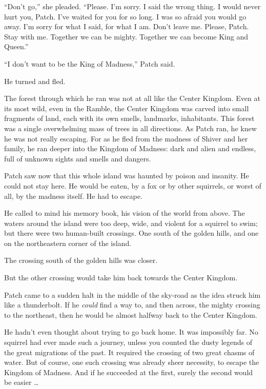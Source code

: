 \documentclass[ebook,oneside,openany,17pt]{memoir}
\newenvironment{tolerant}[1]{%
  \par\tolerance=#1\relax
}{%
  \par
}
\begin{document}
\begin{tolerant}{1000}
“Don’t go,” she pleaded. “Please. I’m sorry. I said the wrong thing. I
would never hurt you, Patch. I’ve waited for you for so long. I was so
afraid you would go away. I’m sorry for what I said, for what I
am. Don’t leave me. Please, Patch. Stay with me. Together we can be
mighty. Together we can become King and Queen.”
\end{tolerant}

“I don’t want to be the King of Madness,” Patch said.

He turned and fled.

The forest through which he ran was not at all like the Center
Kingdom. Even at its most wild, even in the Ramble, the Center Kingdom
was carved into small fragments of land, each with its own smells,
landmarks, inhabitants. This forest was a single overwhelming mass of
trees in all directions. As Patch ran, he knew he was not really
escaping. For as he fled from the madness of Shiver and her family, he
ran deeper into the Kingdom of Madness: dark and alien and endless,
full of unknown sights and smells and dangers.

Patch saw now that this whole island was haunt\-ed by poison and
insanity. He could not stay here. He would be eaten, by a fox or by
other squirrels, or worst of all, by the madness itself. He had to
escape.

He called to mind his memory book, his vision of the world from
above. The waters around the island were too deep, wide, and violent
for a squirrel to swim; but there were two human-built crossings. One
south of the golden hills, and one on the northeastern corner of the
island.

The crossing south of the golden hills was closer.

But the other crossing would take him back towards the Center Kingdom.

Patch came to a sudden halt in the middle of the sky-road as the idea
struck him like a thunderbolt. If he \emph{could} find a way to, and
then across, the mighty crossing to the northeast, then he would be
almost halfway back to the Center Kingdom.

He hadn’t even thought about trying to go back home. It was impossibly
far. No squirrel had ever made such a journey, unless you counted the
dusty legends of the great migrations of the past. It required the
crossing of two great chasms of water. But of course, one such
crossing was already sheer necessity, to escape the Kingdom of
Madness. And if he succeeded at the first, surely the second would be
easier …
\end{document}
